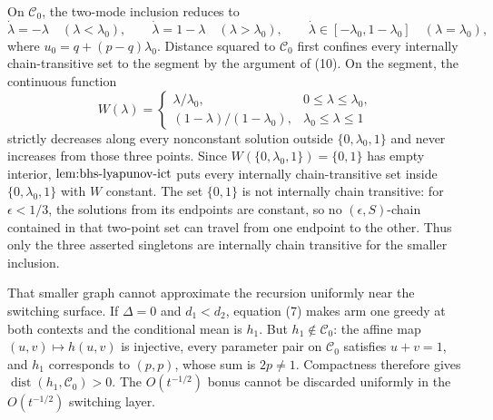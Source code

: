 On \(\mathcal C_0\), the two-mode inclusion reduces to
\[
 \dot\lambda=-\lambda\quad(\lambda<\lambda_0),\qquad
 \dot\lambda=1-\lambda\quad(\lambda>\lambda_0),\qquad
 \dot\lambda\in[-\lambda_0,1-\lambda_0]\quad(\lambda=\lambda_0), \tag{13}
\]
where \(u_0=q+(p-q)\lambda_0\).  Distance squared to \(\mathcal C_0\) first confines every internally chain-transitive set to the segment by the argument of (10).  On the segment, the continuous function
\[
 W(\lambda)=
 \begin{cases}
 \lambda/\lambda_0,&0\leq\lambda\leq\lambda_0,\\
 (1-\lambda)/(1-\lambda_0),&\lambda_0\leq\lambda\leq1
 \end{cases}
\]
strictly decreases along every nonconstant solution outside \(\{0,\lambda_0,1\}\) and never increases from those three points.  Since \(W(\{0,\lambda_0,1\})=\{0,1\}\) has empty interior, \(\textnormal{lem:bhs-lyapunov-ict}\) puts every internally chain-transitive set inside \(\{0,\lambda_0,1\}\) with \(W\) constant.  The set \(\{0,1\}\) is not internally chain transitive: for \(\epsilon<1/3\), the solutions from its endpoints are constant, so no \((\epsilon,S)\)-chain contained in that two-point set can travel from one endpoint to the other.  Thus only the three asserted singletons are internally chain transitive for the smaller inclusion.

That smaller graph cannot approximate the recursion uniformly near the switching surface.  If \(\Delta=0\) and \(d_1<d_2\), equation (7) makes arm one greedy at both contexts and the conditional mean is \(h_1\).  But \(h_1\notin\mathcal C_0\): the affine map \((u,v)\mapsto h(u,v)\) is injective, every parameter pair on \(\mathcal C_0\) satisfies \(u+v=1\), and \(h_1\) corresponds to \((p,p)\), whose sum is \(2p\neq1\).  Compactness therefore gives \(\operatorname{dist}(h_1,\mathcal C_0)>0\).  The \(O(t^{-1/2})\) bonus cannot be discarded uniformly in the \(O(t^{-1/2})\) switching layer.

